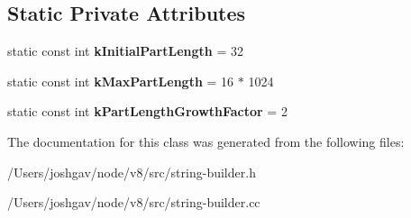 \subsection*{Static Private Attributes}
\begin{DoxyCompactItemize}
\item 
static const int {\bfseries k\+Initial\+Part\+Length} = 32\hypertarget{classv8_1_1internal_1_1_incremental_string_builder_a9caeb87827b4467964195c723487f63a}{}\label{classv8_1_1internal_1_1_incremental_string_builder_a9caeb87827b4467964195c723487f63a}

\item 
static const int {\bfseries k\+Max\+Part\+Length} = 16 $\ast$ 1024\hypertarget{classv8_1_1internal_1_1_incremental_string_builder_a6e67e4902f68314359dd797ebc2a3ae5}{}\label{classv8_1_1internal_1_1_incremental_string_builder_a6e67e4902f68314359dd797ebc2a3ae5}

\item 
static const int {\bfseries k\+Part\+Length\+Growth\+Factor} = 2\hypertarget{classv8_1_1internal_1_1_incremental_string_builder_a8376756e7dfb7a63dae7eb43ac132eda}{}\label{classv8_1_1internal_1_1_incremental_string_builder_a8376756e7dfb7a63dae7eb43ac132eda}

\end{DoxyCompactItemize}


The documentation for this class was generated from the following files\+:\begin{DoxyCompactItemize}
\item 
/\+Users/joshgav/node/v8/src/string-\/builder.\+h\item 
/\+Users/joshgav/node/v8/src/string-\/builder.\+cc\end{DoxyCompactItemize}
